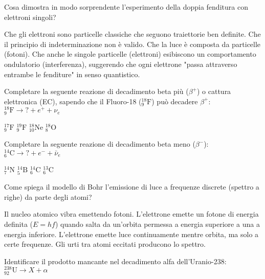 \documentclass{exam}%
\begin{document}
\begin{questions}%
\question Cosa dimostra in modo sorprendente l'esperimento della doppia fenditura con elettroni singoli?%
\vspace{0.2em}%
\begin{choices}%
\choice Che gli elettroni sono particelle classiche che seguono traiettorie ben definite.%
\choice Che il principio di indeterminazione non è valido.%
\choice Che la luce è composta da particelle (fotoni).%
\choice Che anche le singole particelle (elettroni) esibiscono un comportamento ondulatorio (interferenza), suggerendo che ogni elettrone "passa attraverso entrambe le fenditure" in senso quantistico.%
\end{choices}%
\question Completare la seguente reazione di decadimento beta più ($\beta^+$) o cattura elettronica (EC), sapendo che il Fluoro-18 ($^{18}_{9}\text{F}$) può decadere $\beta^+$: $^{18}_{9}\text{F} \rightarrow ? + e^+ + \nu_e$%
\vspace{0.2em}%
\begin{multicols}{4}%
\begin{choices}%
\choice $^{17}_{9}\text{F}$%
\choice $^{19}_{9}\text{F}$%
\choice $^{18}_{10}\text{Ne}$%
\choice $^{18}_{8}\text{O}$%
\end{choices}%
\end{multicols}%
\question Completare la seguente reazione di decadimento beta meno ($\beta^-$): $^{14}_{6}\text{C} \rightarrow ? + e^- + \bar{\nu}_e$%
\vspace{0.2em}%
\begin{multicols}{4}%
\begin{choices}%
\choice $^{14}_{7}\text{N}$%
\choice $^{14}_{5}\text{B}$%
\choice $^{14}_{6}\text{C}$%
\choice $^{13}_{6}\text{C}$%
\end{choices}%
\end{multicols}%
\question Come spiega il modello di Bohr l'emissione di luce a frequenze discrete (spettro a righe) da parte degli atomi?%
\vspace{0.2em}%
\begin{choices}%
\choice Il nucleo atomico vibra emettendo fotoni.%
\choice L'elettrone emette un fotone di energia definita ($E = hf$) quando salta da un'orbita permessa a energia superiore a una a energia inferiore.%
\choice L'elettrone emette luce continuamente mentre orbita, ma solo a certe frequenze.%
\choice Gli urti tra atomi eccitati producono lo spettro.%
\end{choices}%
\question Identificare il prodotto mancante nel decadimento alfa dell'Uranio-238: $^{238}_{92}\text{U} \rightarrow X + \alpha$%

\end{questions}
\end{document}
